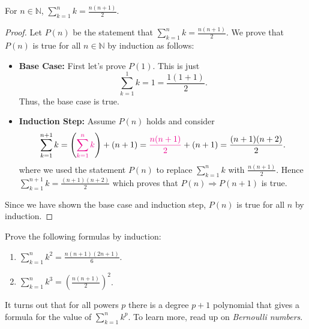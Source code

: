 \documentclass[11pt,dvipsnames]{book}
\numberwithin{equation}{section} %
\numberwithin{figure}{section} %
\numberwithin{table}{section} %
\begin{document}
\begin{example}
For $n\in\mathbb{N}$, $\sum_{k=1}^{n}k=\frac{n(n+1)}{2}$. 

\begin{proof}
Let $P(n)$ be the statement that $\sum_{k=1}^{n}k=\frac{n(n+1)}{2}$. We prove that $P(n)$ is true for all $n\in\mathbb{N}$ by induction as follows:\\

\begin{itemize}
\item  {\bf Base Case:} First let's prove $P(1)$. This is just
\[
\sum_{k=1}^{1}k=1=\frac{1(1+1)}{2}. 
\]
Thus, the base case is true. \\

\item  {\bf Induction Step:} Assume $P(n)$ holds and consider
\[
\sum_{k=1}^{n+1}k =\left({\color{magenta} \sum_{k=1}^{n} k}\right) + (n+1)  = {\color{magenta} \frac{n(n+1)}{2}} +(n+1) = \frac{(n+1)(n+2)}{2}.
\]
where we used the statement $P(n)$ to replace \(\sum_{k=1}^{n} k\) with \(\frac{n(n+1)}{2} \).
Hence \(\sum_{k=1}^{n+1}k=\frac{(n+1)(n+2)}{2}\) which proves that 
$P(n)\Rightarrow P(n+1)$ is true.
\end{itemize}
Since we have shown the base case and induction step, $P(n)$ is true for all $n$ by induction.
\end{proof}
\end{example}



\begin{exercise}
Prove the following formulas by induction:
\begin{enumerate}[label=(\alph*)]
\item $\sum_{k=1}^{n} k^{2} = \frac{n(n+1)(2n+1)}{6}$.
\item $\sum_{k=1}^{n} k^{3}  = \left(\frac{n(n+1)}{2}\right)^{2}$. 
\end{enumerate}
It turns out that for all powers $p$ there is a degree $p+1$ polynomial that gives a formula for the value of $\sum_{k=1}^{n} k^{p}$. To learn more, read up on {\it Bernoulli numbers}.
\end{exercise}

%
%
%
\end{document}

